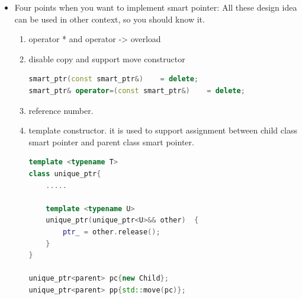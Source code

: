\documentclass[a4paper,11pt,twoside]{book}
\begin{document}
\begin{itemize}
	\item Four points when you want to implement smart pointer: All these design idea can be used in other context, so you should know it. 
	\begin{enumerate}
		\item operator * and operator -> overload
		\item disable copy and support move constructor
\begin{lstlisting}[frame=single, language=c++, mathescape=true]
smart_ptr(const smart_ptr&)    = delete;  
smart_ptr& operator=(const smart_ptr&)    = delete;
\end{lstlisting}

		\item reference number. 
		
		\item template constructor. it is used to support assignment between child class smart pointer and parent class smart pointer.
		
\begin{lstlisting}[frame=single, language=c++, mathescape=true]
template <typename T>
class unique_ptr{
	.....
	
	template <typename U>  
	unique_ptr(unique_ptr<U>&& other)  {
		ptr_ = other.release();  
	}
}

unique_ptr<parent> pc{new Child};
unique_ptr<parent> pp{std::move(pc)};
\end{lstlisting}

	\end{enumerate}

\end{itemize}
\end{document}
